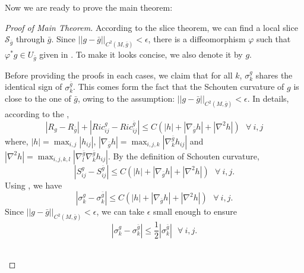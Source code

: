 \documentclass[12pt]{amsart}
\newcommand{\bg}{\bar{g}}
\numberwithin{equation}{section}
\begin{document}
Now we are ready to prove the main theorem:
\begin{proof}[Proof of Main Theorem]
    According to the slice theorem, we can find a local slice $\mathcal{S}_{\bg}$ through $\bg$. Since $||g - \bg||_{C^2(M,\bg)} < \epsilon$, there is a diffeomorphism $\varphi$ such that $\varphi^*g \in U_{\bg}$ given in . To make it looks concise, we also denote it by $g$.

    Before providing the proofs in each cases, we claim that for all $k$, $\sigma_k^g$ shares the identical sign of $\sigma_k^{\bg}$. This comes form the fact that the Schouten curvature of $g$ is close to the one of $\bg$, owing to the assumption: $||g - \bg||_{C^2(M,\bg)} < \epsilon$. In details, according to the ,
    \begin{equation*}
        |R_g-R_{\bg}|+|Ric_{ij}^g-Ric_{ij}^{\bg}|\leq C(|h|+|\nabla_{\bg}h|+|\nabla^2h|)\ \ \ \forall\ i,j
    \end{equation*}
    where, $|h|=\max_{i,j}|h_{ij}|$, $|\nabla_{\bg}h|=\max_{i,j,k}|\nabla^{\bg}_kh_{ij}|$ and $|\nabla^2h|=\max_{i,j,k,l}|\nabla^{\bg}_l\nabla^{\bg}_kh_{ij}|$. By the definition of Schouten curvature,
    \begin{equation*}
        |S_{ij}^g-S_{ij}^{\bg}|\leq C(|h|+|\nabla_{\bg}h|+|\nabla^2h|)\ \ \ \forall\ i,j.
    \end{equation*}
    Using , we have
    \begin{equation*}
        |\sigma_k^g-\sigma_k^{\bg}|\leq C(|h|+|\nabla_{\bg}h|+|\nabla^2h|)\ \ \ \forall\ i,j.
    \end{equation*}
    Since $||g - \bg||_{C^2(M,\bg)} < \epsilon$, we can take $\epsilon$ small enough to ensure
    \begin{equation*}
        |\sigma_k^g-\sigma_k^{\bg}|\leq \frac{1}{2}|\sigma_k^{\bg}|\ \ \ \forall\ i,j.
    \end{equation*}

    \ \\


\end{proof}
\end{document}
